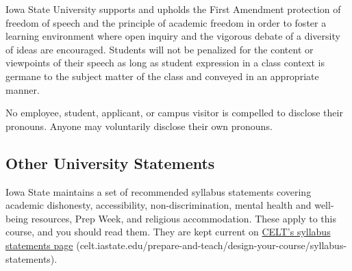 \documentclass[11pt]{amsart}
\begin{document}
\begin{raggedright}
Iowa State University supports and upholds the First Amendment protection of freedom of speech and the principle of academic freedom in order to foster a learning environment where open inquiry and the vigorous debate of a diversity of ideas are encouraged. Students will not be penalized for the content or viewpoints of their speech as long as student expression in a class context is germane to the subject matter of the class and conveyed in an appropriate manner.

\vspace{0.1in}

No employee, student, applicant, or campus visitor is compelled to disclose their pronouns. Anyone may voluntarily disclose their own pronouns.

\subsection{Other University Statements}

Iowa State maintains a set of recommended
syllabus statements covering academic dishonesty, accessibility, non-discrimination,
mental health and well-being resources, Prep Week, and religious accommodation.  These
apply to this course, and you should read them.  They are kept current on
\href{https://celt.iastate.edu/prepare-and-teach/design-your-course/syllabus-statements/}%
{CELT's syllabus statements page}
(celt.iastate.edu/prepare-and-teach/design-your-course/syllabus-statements).

\end{raggedright}
\end{document}
